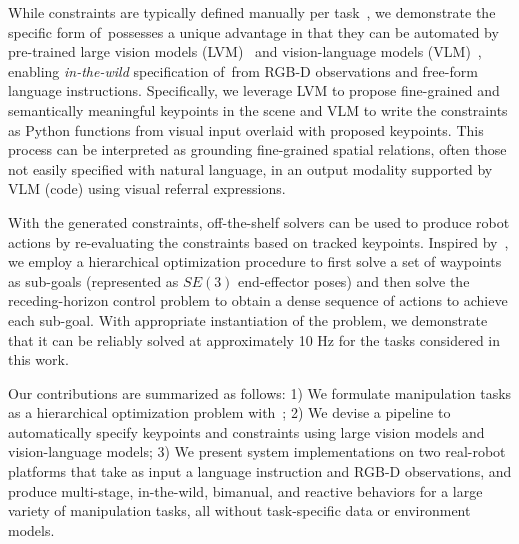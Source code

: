 While constraints are typically defined manually per task~\cite{manuelli2019kpam},
we demonstrate the specific form of~\algabrvname possesses a unique advantage in that they can be automated by pre-trained large vision models (LVM)~\cite{oquab2023dinov2} and vision-language models (VLM)~\cite{openai2023gpt}, enabling \emph{in-the-wild} specification of~\algabrvname from RGB-D observations and free-form language instructions.
Specifically, we leverage LVM to propose fine-grained and semantically meaningful keypoints in the scene and VLM to write the constraints as Python functions from visual input overlaid with proposed keypoints.
This process can be interpreted as grounding fine-grained spatial relations, often those not easily specified with natural language, in an output modality supported by VLM (code) using visual referral expressions.

With the generated constraints, off-the-shelf solvers can be used to produce robot actions by re-evaluating the constraints based on tracked keypoints. Inspired by~\cite{toussaint2022sequence}, we employ a hierarchical optimization procedure to first solve a set of waypoints as sub-goals (represented as $SE(3)$ end-effector poses) and then solve the receding-horizon control problem to obtain a dense sequence of actions to achieve each sub-goal.
With appropriate instantiation of the problem, we demonstrate that it can be reliably solved at approximately 10 Hz for the tasks considered in this work.


Our contributions are summarized as follows: 1) We formulate manipulation tasks as a hierarchical optimization problem with~\algname; 2) We devise a pipeline to automatically specify keypoints and constraints using large vision models and vision-language models; 3) We present system implementations on two real-robot platforms that take as input a language instruction and RGB-D observations, and produce multi-stage, in-the-wild, bimanual, and reactive behaviors for a large variety of manipulation tasks, all without task-specific data or environment models. 
